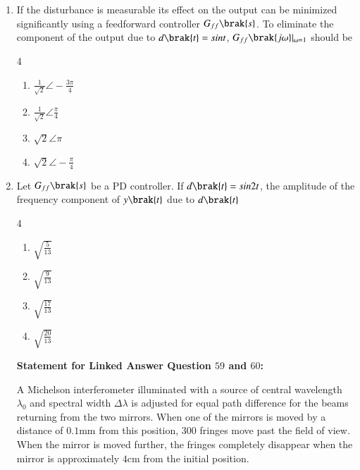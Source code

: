 \documentclass[journal,12pt,onecolumn]{IEEEtran}
\theoremstyle{remark}
\begin{document}
\begin{enumerate}
\item If the disturbance is measurable its effect on the output can be minimized significantly using a feedforward controller $G_{f f}\brak{s}$. To eliminate the component of the output due to $d\brak{t}=sint$, $G_{ff}\brak{j\omega}|_{\omega=1}$ should be \par \hfill{}
\begin{multicols}{4}
\begin{enumerate}
    \item $\frac{1}{\sqrt2}\angle-\frac{3\pi}{4}$
    \item $\frac{1}{\sqrt2}\angle\frac{\pi}{4}$
    \item ${\sqrt2}\angle\pi$
    \item ${\sqrt2}\angle-\frac{\pi}{4}$
\end{enumerate}
\end{multicols}

\item Let $G_{ff}\brak{s}$ be a PD controller. If $d\brak{t}=sin2t$, the amplitude of the frequency component of $y\brak{t}$ due to $d\brak{t}$ \par \hfill{}
\begin{multicols}{4}
\begin{enumerate}
    \item $\sqrt{\frac{5}{13}}$
    \item $\sqrt{\frac{9}{13}}$
    \item $\sqrt{\frac{17}{13}}$
    \item $\sqrt{\frac{20}{13}}$
\end{enumerate}
\end{multicols}

\vspace{0.5cm}

\textbf{Statement for Linked Answer Question $59$ and $60$:} \par
\vspace{0.5cm}
A Michelson interferometer illuminated with a source of central wavelength $\lambda_0$ and spectral width $\Delta\lambda$  is adjusted for equal path difference for the beams returning from the two mirrors. When one of the mirrors is moved by a distance of $0.1\text{mm}$ from this position, $300$ fringes move past the field of view. When the mirror is moved further, the fringes completely disappear when the mirror is approximately $4\text{cm}$ from the initial position.

\vspace{0.5cm}


\end{enumerate}
\end{document}
